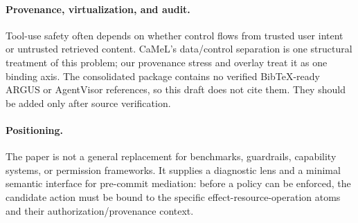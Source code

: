 \paragraph{Provenance, virtualization, and audit.}
Tool-use safety often depends on whether control flows from trusted user intent or untrusted retrieved content. CaMeL's data/control separation is one structural treatment of this problem; our provenance stress and overlay treat it as one binding axis. The consolidated package contains no verified BibTeX-ready ARGUS or AgentVisor references, so this draft does not cite them. They should be added only after source verification.

\paragraph{Positioning.}
The paper is not a general replacement for benchmarks, guardrails, capability systems, or permission frameworks. It supplies a diagnostic lens and a minimal semantic interface for pre-commit mediation: before a policy can be enforced, the candidate action must be bound to the specific effect-resource-operation atoms and their authorization/provenance context.
